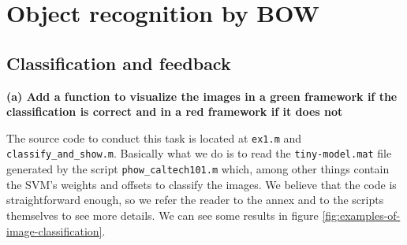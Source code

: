 \section{Object recognition by BOW}

\subsection{Classification and feedback}

{\bfseries (a) Add a function to visualize the images in a green framework if the classification is correct and in a red framework if it does not}

The source code to conduct this task is located at \texttt{ex1.m} and \texttt{classify\_and\_show.m}. Basically what we do is to read the \texttt{tiny-model.mat} file generated by the script \texttt{phow\_caltech101.m} which, among other things contain the SVM's weights and offsets to classify the images. We believe that the code is straightforward enough, so we refer the reader to the annex and to the scripts themselves to see more details. We can see some results in figure \ref{fig:examples-of-image-classification}.

